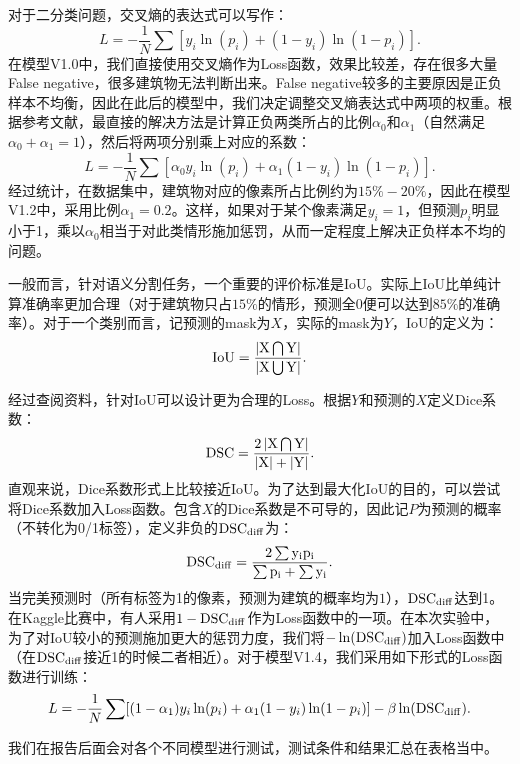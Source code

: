 \documentclass[a4paper,12pt]{article}
\begin{document}
\begin{CJK*}{UTF8}{gbsn}
\begin{spacing}{1.2}
    对于二分类问题，交叉熵的表达式可以写作：
    \begin{equation}
    L = -\frac{1}{N}\sum[y_{i}\ln(p_{i}) + (1-y_{i})\ln(1-p_{i})].
    \end{equation}
    在模型V1.0中，我们直接使用交叉熵作为Loss函数，效果比较差，存在很多大量False negative，很多建筑物无法判断出来。False negative较多的主要原因是正负样本不均衡，因此在此后的模型中，我们决定调整交叉熵表达式中两项的权重。根据参考文献\cite{}，最直接的解决方法是计算正负两类所占的比例$\alpha_{0}$和$\alpha_{1}$（自然满足$\alpha_{0}+\alpha_{1}=1$），然后将两项分别乘上对应的系数：
    \begin{equation}
    L = -\frac{1}{N}\sum[\alpha_{0}y_{i}\ln(p_{i}) + \alpha_{1} (1-y_{i})\ln(1-p_{i})].
    \end{equation}
    经过统计，在数据集中，建筑物对应的像素所占比例约为$15\%-20\%$，因此在模型V1.2中，采用比例$\alpha_{1}=0.2$。这样，如果对于某个像素满足$y_{i}=1$，但预测${p_{i}}$明显小于1，乘以$\alpha_{0}$相当于对此类情形施加惩罚，从而一定程度上解决正负样本不均的问题。
    
    一般而言，针对语义分割任务，一个重要的评价标准是IoU。实际上IoU比单纯计算准确率更加合理（对于建筑物只占$15\%$的情形，预测全0便可以达到$85\%$的准确率）。对于一个类别而言，记预测的mask为$X$，实际的mask为$Y$，IoU的定义为：
    \begin{equation}
    \rm{IoU} = \frac{\left |{X}\bigcap{Y}\right |}{\left |{X}\bigcup{Y}\right |}.
    \end{equation}
    
    经过查阅资料\cite{}，针对IoU可以设计更为合理的Loss。根据$Y$和预测的$X$定义Dice系数：
    \begin{equation}
    \rm{DSC} = \frac{2 \left |{X}\bigcap{Y}\right |}{\left |X \right |+ \left |Y\right |}.
    \end{equation}
    直观来说，Dice系数形式上比较接近IoU。为了达到最大化IoU的目的，可以尝试将Dice系数加入Loss函数。包含$X$的Dice系数是不可导的，因此记$P$为预测的概率（不转化为0/1标签），定义非负的$\rm{DSC}_{diff}$为：
    \begin{equation}
    \rm{{DSC}_{diff}} = \frac{2\sum y_{i}p_{i}}{\sum p_{i} + \sum{y_{i}}}.
    \end{equation}
    当完美预测时（所有标签为1的像素，预测为建筑的概率均为$1$），$\rm{DSC}_{diff}$达到1。在Kaggle比赛中，有人采用$1-\rm{DSC}_{diff}$作为Loss函数中的一项。在本次实验中，为了对IoU较小的预测施加更大的惩罚力度，我们将$-\ln(\rm{DSC}_{diff})$加入Loss函数中（在$\rm{DSC}_{diff}$接近1的时候二者相近）。对于模型V1.4，我们采用如下形式的Loss函数进行训练：
    \begin{equation}
    L = -\frac{1}{N}\sum[(1-\alpha_{1})y_{i}\ln(p_{i}) + \alpha_{1} (1-y_{i})\ln(1-p_{i})] - \beta \ln(\rm{DSC}_{diff}).
    \end{equation}
    
    我们在报告后面会对各个不同模型进行测试，测试条件和结果汇总在表格当中。



    
    
    
\end{spacing}
\end{CJK*}
\end{document}

